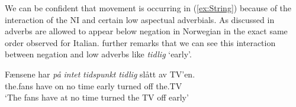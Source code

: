 \documentclass[12pt, letterpaper]{article}
\begin{document}
We can be confident that movement is occurring in (\ref{ex:String}) because of the interaction of the NI and certain low aspectual adverbials. As discussed in \citet{nilsenAdverbsAshift1997} adverbs are allowed to appear below negation in Norwegian in the exact same order \citet{cinqueAdverbsFunctionalHeads1999} observed for Italian. \citet{svenoniusStrainsNegationNorwegian2002} further remarks that we can see this interaction between negation and low adverbs like \emph{tidlig} `early'. 

\ea
	\ea 
	\gll Fænsene har \emph{på} \emph{intet} \emph{tidspunkt} \emph{tidlig} slått av TV’en.\\
	the.fans have on no time early turned off the.TV\\
	\glt `The fans have at no time turned the TV off early’ 
	\z  
\z
\end{document}
